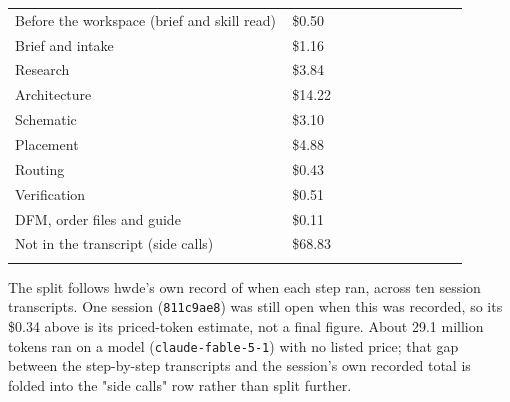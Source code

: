 \begin{hsblock}
\renewcommand{\arraystretch}{1.1}
\par\vspace{8pt}
{\small
\begin{tabular}{L{0.55\linewidth} R{0.35\linewidth}}
\hstoprule
{} &  \\
\hline
Before the workspace (brief and skill read) & \$0.50 \\
Brief and intake & \$1.16 \\
Research & \$3.84 \\
Architecture & \$14.22 \\
Schematic & \$3.10 \\
Placement & \$4.88 \\
Routing & \$0.43 \\
Verification & \$0.51 \\
DFM, order files and guide & \$0.11 \\
Not in the transcript (side calls) & \$68.83 \\
\hline
{} &  \\
\hline
\end{tabular}}
\end{hsblock}

The split follows hwde's own record of when each step ran, across ten
session transcripts. One session (\texttt{811c9ae8}) was still open when
this was recorded, so its \$0.34 above is its priced-token estimate, not a
final figure. About 29.1 million tokens ran on a model
(\texttt{claude-fable-5-1}) with no listed price; that gap between the
step-by-step transcripts and the session's own recorded total is folded into
the "side calls" row rather than split further.


